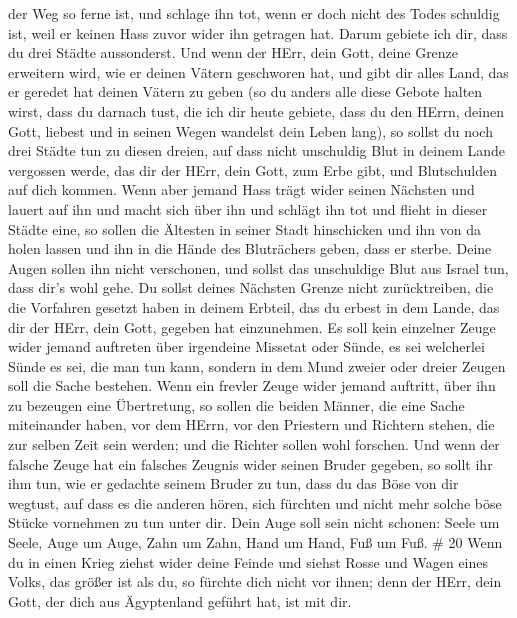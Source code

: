 der Weg so ferne ist, und schlage ihn tot, wenn er doch nicht des Todes
schuldig ist, weil er keinen Hass zuvor wider ihn getragen hat.
 Darum gebiete ich dir, dass du drei Städte aussonderst.
 Und wenn der HErr, dein Gott, deine Grenze erweitern wird,
wie er deinen Vätern geschworen hat, und gibt dir alles Land, das er
geredet hat deinen Vätern zu geben  (so du anders alle diese
Gebote halten wirst, dass du darnach tust, die ich dir heute gebiete,
dass du den HErrn, deinen Gott, liebest und in seinen Wegen wandelst
dein Leben lang), so sollst du noch drei Städte tun zu diesen dreien,
 auf dass nicht unschuldig Blut in deinem Lande vergossen
werde, das dir der HErr, dein Gott, zum Erbe gibt, und Blutschulden auf
dich kommen.  Wenn aber jemand Hass trägt wider seinen
Nächsten und lauert auf ihn und macht sich über ihn und schlägt ihn tot
und flieht in dieser Städte eine,  so sollen die Ältesten
in seiner Stadt hinschicken und ihn von da holen lassen und ihn in die
Hände des Bluträchers geben, dass er sterbe.  Deine Augen
sollen ihn nicht verschonen, und sollst das unschuldige Blut aus Israel
tun, dass dir's wohl gehe.  Du sollst deines Nächsten
Grenze nicht zurücktreiben, die die Vorfahren gesetzt haben in deinem
Erbteil, das du erbest in dem Lande, das dir der HErr, dein Gott,
gegeben hat einzunehmen.  Es soll kein einzelner Zeuge
wider jemand auftreten über irgendeine Missetat oder Sünde, es sei
welcherlei Sünde es sei, die man tun kann, sondern in dem Mund zweier
oder dreier Zeugen soll die Sache bestehen.  Wenn ein
frevler Zeuge wider jemand auftritt, über ihn zu bezeugen eine
Übertretung,  so sollen die beiden Männer, die eine Sache
miteinander haben, vor dem HErrn, vor den Priestern und Richtern stehen,
die zur selben Zeit sein werden;  und die Richter sollen
wohl forschen. Und wenn der falsche Zeuge hat ein falsches Zeugnis wider
seinen Bruder gegeben,  so sollt ihr ihm tun, wie er
gedachte seinem Bruder zu tun, dass du das Böse von dir wegtust,
 auf dass es die anderen hören, sich fürchten und nicht
mehr solche böse Stücke vornehmen zu tun unter dir.  Dein
Auge soll sein nicht schonen: Seele um Seele, Auge um Auge, Zahn um
Zahn, Hand um Hand, Fuß um Fuß. \# 20  Wenn du in einen
Krieg ziehst wider deine Feinde und siehst Rosse und Wagen eines Volks,
das größer ist als du, so fürchte dich nicht vor ihnen; denn der HErr,
dein Gott, der dich aus Ägyptenland geführt hat, ist mit dir.
